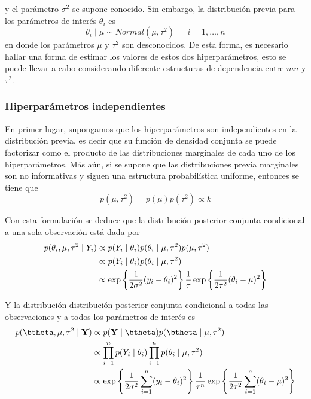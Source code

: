 y el parámetro $\sigma^2$ se supone conocido. Sin embargo, la distribución previa para los parámetros de interés $\theta_i$ es
\begin{equation*}
\theta_i \mid \mu \sim Normal(\mu, \tau^2) \ \ \ \ \ \ \ i=1,\ldots,n
\end{equation*}
en donde los parámetros $\mu$ y $\tau^2$ son desconocidos. De esta forma, es necesario hallar una forma de estimar los valores de estos dos hiperparámetros, esto se puede llevar a cabo considerando diferente estructuras de dependencia entre $mu$ y $\tau^2$. 

\subsubsection{Hiperparámetros independientes}
En primer lugar, supongamos que los hiperparámetros son independientes en la distribución previa, es decir que su función de densidad conjunta se puede factorizar como el producto de las distribuciones marginales de cada uno de los hiperparámetros. Más aún, si se supone que las distribuciones previa marginales son no informativas y siguen una estructura probabilística uniforme, entonces se tiene que
\begin{equation*}
p(\mu,\tau^2)=p(\mu)p(\tau^2)\propto k
\end{equation*}

Con esta formulación se deduce que la distribución posterior conjunta condicional a una sola observación está dada por
\begin{align}
p(\theta_i,\mu,\tau^2 \mid Y_i) &\propto p(Y_i \mid \theta_i)p(\theta_i \mid \mu,\tau^2)p(\mu,\tau^2) \notag \\
&\propto p(Y_i \mid \theta_i)p(\theta_i \mid \mu,\tau^2) \notag \\
&\propto \exp\left\{\frac{1}{2\sigma^2}(y_i-\theta_i)^2\right\}
\frac{1}{\tau}\exp\left\{\frac{1}{2\tau^2}(\theta_i-\mu)^2\right\}
\end{align}

Y la distribución distribución posterior conjunta condicional a todas las observaciones y a todos los parámetros de interés es
\begin{align*}
p(\btheta,\mu,\tau^2 \mid \mathbf{Y})
&\propto p(\mathbf{Y} \mid \btheta)p(\btheta \mid \mu,\tau^2)  \\
&\propto \prod_{i=1}^n p(Y_i \mid \theta_i) \prod_{i=1}^n p(\theta_i \mid \mu,\tau^2)  \\
&\propto \exp\left\{\frac{1}{2\sigma^2}\sum_{i=1}^n(y_i-\theta_i)^2\right\}
\frac{1}{\tau^n}\exp\left\{\frac{1}{2\tau^2}\sum_{i=1}^n(\theta_i-\mu)^2\right\}
\end{align*}

